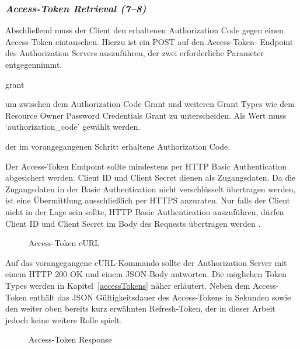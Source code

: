\subsubsection{\textit{Access-Token Retrieval (7--8)}}
Abschließend muss der Client den erhaltenen Authorization Code gegen
einen Access-Token eintauschen. Hierzu ist ein POST auf den Access-Token-
Endpoint des Authorization Servers auszuführen, der zwei erforderliche
Parameter entgegennimmt.

\begin{labeling}{grant}
    \item [grant\_type] um zwischen dem Authorization Code Grant und
    weiteren Grant Types wie dem Resource Owner Password Credentials Grant
    zu unterscheiden. Als Wert muss `authorization\_code' gewählt werden.
    \item [code] der im vorangegangenen Schritt erhaltene Authorization
    Code.
\end{labeling}
Der Access-Token Endpoint sollte mindestens per HTTP Basic Authentication
abgesichert werden. Client ID und Client Secret dienen als Zugangsdaten.
Da die Zugangsdaten in der Basic Authentication nicht verschlüsselt
übertragen werden, ist eine Übermittlung ausschließlich per HTTPS anzuraten.
Nur falls der Client nicht in der Lage sein sollte, HTTP Basic Authentication
auszuführen, dürfen Client ID und Client Secret im Body des Requests
übertragen werden .

\begin{figure}[h]
    \scalebox{.8}{
        
    }
    \caption{Access-Token cURL}\label{ls: Access-Token cURL}
\end{figure}

Auf das vorangegangene cURL-Kommando sollte der Authorization Server mit
einem HTTP 200 OK und einem JSON-Body antworten. Die möglichen Token Types
werden in Kapitel~\ref{accessTokens} näher erläutert. Neben dem Access-Token
enthält das JSON Gültigkeitsdauer des Access-Tokens in Sekunden sowie
den weiter oben bereits kurz erwähnten Refresh-Token, der in dieser Arbeit
jedoch keine weitere Rolle spielt.

\begin{figure}[h]
    \scalebox{.8}{
        
    }
    \caption{Access-Token Response}\label{ls: Access-Token Response}
\end{figure}

